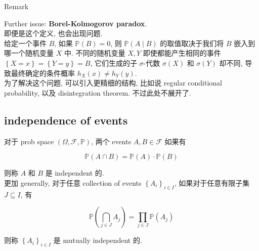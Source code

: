 \begin{qlremark}{Remark}

Further issue: \textbf{Borel-Kolmogorov paradox}.\\
即便是这个定义, 也会出现问题.\\
给定一个事件 \(\mathit{B}\), 如果 \(\mathbb{P}(\mathit{B}) = 0\), 则 \(\mathbb{P}(\mathit{A} \mid \mathit{B})\) 的取值取决于我们将 \(\mathit{B}\) 嵌入到哪一个随机变量 \(\mathit{X}\) 中. 不同的随机变量 \(\mathit{X},\mathit{Y}\) 即使都能产生相同的事件 \(\left\{ {\mathit{X} = \mathit{x}} \right\} = \left\{ {\mathit{Y} = \mathit{y}} \right\} = \mathit{B}\), 它们生成的子 \(\mathit{\sigma}\)-代数 \(\mathit{\sigma}(\mathit{X})\) 和 \(\mathit{\sigma}(\mathit{Y})\) 却不同, 导致最终确定的条件概率 \(h_{\mathit{X}}(\mathit{x}) \neq h_{\mathit{Y}}(\mathit{y})\).\\
为了解决这个问题, 可以引入更精细的结构, 比如说 regular conditional probability, 以及 disintegration theorem. 不过此处不展开了.

\end{qlremark}

\subsection{independence of events}\label{independence-of-events}

\begin{definition}{}

对于 prob space \((\Omega,\mathcal{F},\mathbb{P})\), 两个 events \(\mathit{A},\mathit{B} \in \mathcal{F}\) 如果有

\[\mathbb{P}(\mathit{A} \cap \mathit{B}) = \mathbb{P}(\mathit{A}) \cdot \mathbb{P}(\mathit{B})\]

则称 \(\mathit{A}\) 和 \(\mathit{B}\) 是 independent 的.\\
更加 generally, 对于任意 collection of events \(\left\{ \mathit{A}_{\mathit{i}} \right\}_{\mathit{i} \in \mathit{I}}\), 如果对于任意有限子集 \(\mathit{J} \subseteq \mathit{I}\), 有

\[\mathbb{P}\left( {\bigcap\limits_{\mathit{j} \in \mathit{J}}\mathit{A}_{\mathit{j}}} \right) = \prod\limits_{\mathit{j} \in \mathit{J}}\mathbb{P}(\mathit{A}_{\mathit{j}})\]

则称 \(\left\{ \mathit{A}_{\mathit{i}} \right\}_{\mathit{i} \in \mathit{I}}\) 是 mutually independent 的.

\end{definition}

